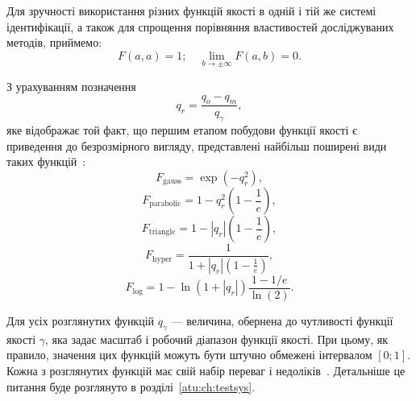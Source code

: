 Для зручності використання різних функцій якості в одній і
тій же системі ідентифікації, а також для спрощення порівняння
властивостей досліджуваних методів, приймемо:
%
\begin{equation}
  F(a,a) = 1;
  \quad
  \lim\limits_{b \to \pm \infty } F(a,b) = 0.
  \label{atu:eq:F_scale}
\end{equation}




З урахуванням позначення
\begin{equation}
  q_r = \frac{q_o - q_m}{q_\gamma},
\label{atu:eq:q_r}
\end{equation}
%
\noindent
яке відображає той факт, що першим етапом побудови функції якості
є приведення до безрозмірного вигляду, представлені найбільш
поширені види таких функцій~\cite{atu_ISDMCI2016,atu_asau24}:
%
\begin{equation}
  F_{\mathrm{gauss}} = \exp( - q_r^2 ),
\label{atu:eq:F_gauss}
\end{equation}
%
\begin{equation}
  F_{\mathrm{parabolic}} = 1 - q_r^2 \left( 1 - \frac{1}{e} \right),
\label{atu:eq:F_parabolic}
\end{equation}
%
\begin{equation}
  F_{\mathrm{triangle}} = 1 - |q_r| \left( 1 - \frac{1}{e} \right),
\label{atu:eq:F_triangle}
\end{equation}
%
\begin{equation}
  F_{\mathrm{hyper}} = \frac{1}{ 1 + |q_r| \left( 1 - \frac{1}{e} \right)},
\label{atu:eq:F_hyper}
\end{equation}
%
\begin{equation}
  F_{\mathrm{log}} = 1 - \ln \left( 1 + |q_r| \right) \frac{1-1/e}{\ln(2)}.
\label{atu:eq:F_log}
\end{equation}

Для усіх розглянутих функцій $q_\gamma$\label{atu:d:q_gamma}
--- величина, обернена до чутливості функції якості $\gamma$\label{atu:d:gamma},
яка задає масштаб і робочий діапазон функції якості.
При цьому, як правило, значення цих функцій можуть бути штучно
обмежені інтервалом
$[0; 1]$. Кожна з розглянутих функцій має свій набір переваг і
недоліків~\cite{atu_ISDMCI2016}. Детальніше це питання буде розглянуто
в розділі~\ref{atu:ch:testsys}.

